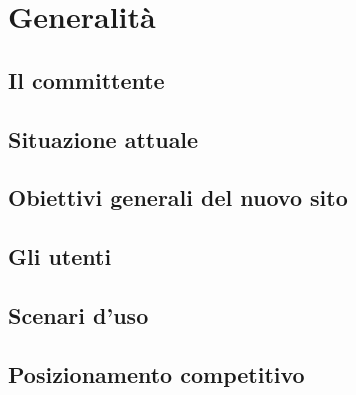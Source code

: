 
\chapter{Generalità}\label{chap:generalita}

\section{Il committente}\label{sec:il-committente}

\section{Situazione attuale}\label{sec:situazione-attuale}

\section{Obiettivi generali del nuovo sito}\label{sec:obiettivi-generali-del-nuovo-sito}

\section{Gli utenti}\label{sec:gli-utenti}

\section{Scenari d'uso}\label{sec:scenari-duso}

\section{Posizionamento competitivo}\label{sec:posizionamento-competitivo}
